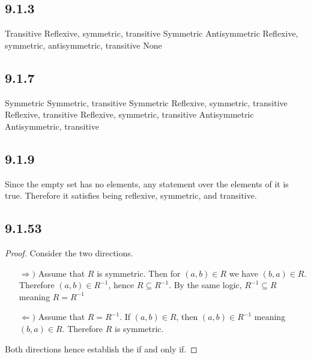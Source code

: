 \documentclass[12pt,titlepage]{extarticle}
\begin{document}
\subsection*{9.1.3}
\begin{tasks}
    \task Transitive 
    \task Reflexive, symmetric, transitive 
    \task Symmetric 
    \task Antisymmetric
    \task Reflexive, symmetric, antisymmetric, transitive
    \task None
\end{tasks}

\subsection*{9.1.7}
\begin{tasks}
    \task Symmetric 
    \task Symmetric, transitive 
    \task Symmetric
    \task Reflexive, symmetric, transitive 
    \task Reflexive, transitive 
    \task Reflexive, symmetric, transitive 
    \task Antisymmetric
    \task Antisymmetric, transitive
\end{tasks}


\subsection*{9.1.9}
Since the empty set has no elements, any statement over the elements of it is true. Therefore it satisfies being reflexive, symmetric, and transitive.

\subsection*{9.1.53}
\begin{proof}
    Consider the two directions.
    \begin{enumerate}
        \item[$\Rightarrow)$]
            Assume that $R$ is symmetric. Then for $(a,b) \in R$ we have $(b,a) \in R$. Therefore $(a,b) \in R^{-1}$, hence $R \subseteq R^{-1}$. By the same logic, $R^{-1} \subseteq R$ meaning $R = R^{-1}$
        \item[$\Leftarrow)$]
            Assume that $R = R^{-1}$. If $(a,b) \in R$, then $(a,b) \in R^{-1}$ meaning $(b,a) \in R$. Therefore $R$ is symmetric.
    \end{enumerate}
    Both directions hence establish the if and only if.
\end{proof}
\end{document}
